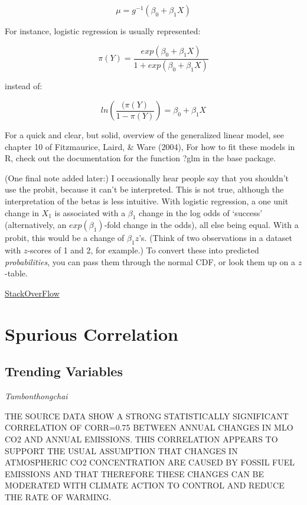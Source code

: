 \documentclass[
]{book}
\begin{document}
\[μ=g^{−1}(β_0+β_1 X)\]

For instance, logistic regression is usually represented:

\[π(Y)=\frac{exp(β_0 + β_1 X)}{1+exp(β_0 + β_1 X)}\]

instead of:

\[ln(\frac{(π(Y)}{1−π(Y)}) = β_0 + β_1 X\]

For a quick and clear, but solid, overview of the generalized linear model,
see chapter 10 of Fitzmaurice, Laird, \& Ware (2004),
For how to fit these models in R, check out the documentation for the function ?glm in the base package.

(One final note added later:) I occasionally hear people say that
you shouldn't use the probit, because it can't be interpreted.
This is not true, although the interpretation of the betas is less intuitive.
With logistic regression, a one unit change in \(X_1\) is associated with
a \(β_1\) change in the log odds of `success'
(alternatively, an \(exp(β_1)\)-fold change in the odds), all else being equal.
With a probit, this would be a change of \(β_1 z\)'s.
(Think of two observations in a dataset with \(z\)-scores of 1 and 2, for example.)
To convert these into predicted \emph{probabilities},
you can pass them through the normal CDF, or look them up on a \(z\)-table.

\href{https://stats.stackexchange.com/questions/20523/difference-between-logit-and-probit-models/30909\#30909}{StackOverFlow}

\hypertarget{spurious-correlation}{%
\chapter{Spurious Correlation}\label{spurious-correlation}}

\hypertarget{trending-variables}{%
\section{Trending Variables}\label{trending-variables}}

\emph{Tambonthongchai}

THE SOURCE DATA SHOW A STRONG STATISTICALLY SIGNIFICANT CORRELATION OF CORR=0.75 BETWEEN ANNUAL CHANGES IN MLO CO2 AND ANNUAL EMISSIONS. THIS CORRELATION APPEARS TO SUPPORT THE USUAL ASSUMPTION THAT CHANGES IN ATMOSPHERIC CO2 CONCENTRATION ARE CAUSED BY FOSSIL FUEL EMISSIONS AND THAT THEREFORE THESE CHANGES CAN BE MODERATED WITH CLIMATE ACTION TO CONTROL AND REDUCE THE RATE OF WARMING.
\end{document}
